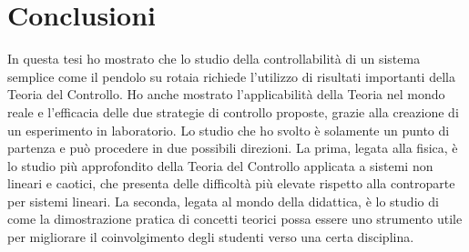 \chapter{Conclusioni}
In questa tesi ho mostrato che lo studio della
controllabilità di un sistema semplice come il
pendolo su rotaia richiede l'utilizzo di risultati importanti della
Teoria del Controllo.
Ho anche mostrato l'applicabilità della Teoria nel mondo reale e
l'efficacia delle due strategie di controllo proposte,
grazie alla creazione di un esperimento in laboratorio.
Lo studio che ho svolto è solamente un punto di partenza
e può procedere in due possibili direzioni.
La prima, legata alla fisica, è lo studio più approfondito
della Teoria del Controllo
applicata a sistemi non lineari e caotici,
che presenta delle difficoltà
più elevate rispetto alla controparte per sistemi lineari.
La seconda, legata al mondo della didattica, è lo studio di come
la dimostrazione
pratica di concetti teorici possa essere uno strumento utile per migliorare il
coinvolgimento degli studenti verso una certa disciplina.
